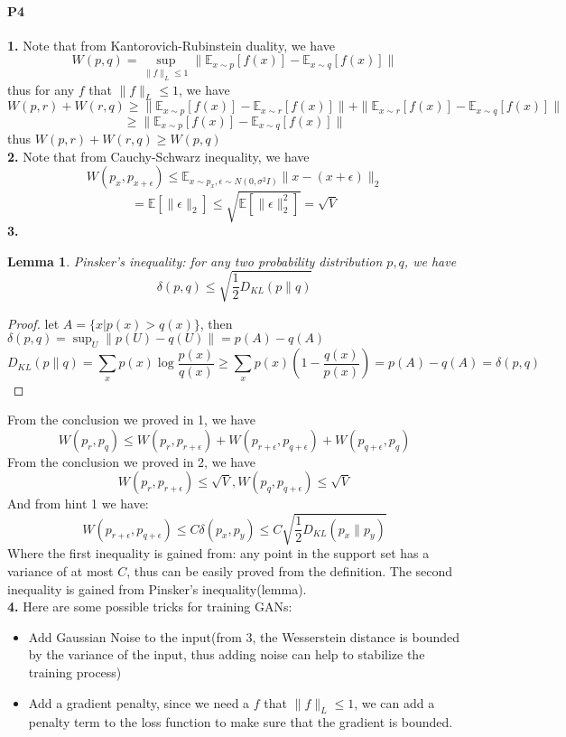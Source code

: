 \documentclass[a4 paper,12pt]{article}
\theoremstyle{definitionstyle}
\newtheorem{lem}{Lemma}
\newenvironment{framedminipage}
    {\begin{framed}\begin{minipage}{0.9\textwidth}}
    {\end{minipage}\end{framed}}
\begin{document}
\paragraph{P4}\textbf{1.} Note that from Kantorovich-Rubinstein duality, we have
\[
  W(p,q)=\sup_{\|f\|_L\le 1}\|\mathbb{E}_{x\sim p}[f(x)]-\mathbb{E}_{x\sim q}[f(x)]\|
\]
thus for any $f$ that $\|f\|_L\le 1$, we have
\[
  W(p,r)+W(r,q)\ge \|\mathbb{E}_{x\sim p}[f(x)]-\mathbb{E}_{x\sim r}[f(x)]\|+\|\mathbb{E}_{x\sim r}[f(x)]-\mathbb{E}_{x\sim q}[f(x)]\|
\]
\[
  \ge \|\mathbb{E}_{x\sim p}[f(x)]-\mathbb{E}_{x\sim q}[f(x)]\|
\]
thus $W(p,r)+W(r,q)\ge W(p,q)$\\
\textbf{2.} Note that from Cauchy-Schwarz inequality, we have
\[
  W(p_x,p_{x+\epsilon})\le\mathbb{E}_{x\sim p_x,\epsilon\sim N(0,\sigma^2 I)}\|x-(x+\epsilon)\|_2
\]
\[
  =\mathbb{E}[\|\epsilon\|_2]\le\sqrt{\mathbb{E}[\|\epsilon\|_2^2]}=\sqrt{V}
\]
\textbf{3.}
\begin{framedminipage}
\begin{lem}
Pinsker's inequality: for any two probability distribution $p,q$, we have
\[
  \delta(p,q)\le\sqrt{\frac 1 2 D_{KL}(p\|q)}
\]
\end{lem}
\end{framedminipage}
\begin{proof}
let $A=\{x|p(x)>q(x)\}$, then $\delta(p,q)=\sup_U\|p(U)-q(U)\|=p(A)-q(A)$
\[
  D_{KL}(p\|q)=\sum_x p(x)\log\frac{p(x)}{q(x)}\ge\sum_x p(x)(1-\frac{q(x)}{p(x)})=p(A)-q(A)=\delta(p,q)
\]
\end{proof}
From the conclusion we proved in 1, we have
\[
  W(p_r,p_q)\le W(p_r,p_{r+\epsilon})+W(p_{r+\epsilon},p_{q+\epsilon})+W(p_{q+\epsilon},p_q)
\]
From the conclusion we proved in 2, we have
\[
  W(p_r,p_{r+\epsilon})\le\sqrt{V},W(p_{q},p_{q+\epsilon})\le\sqrt{V}
\]
And from hint 1 we have:
\[
  W(p_{r+\epsilon},p_{q+\epsilon})\le C\delta(p_x,p_y)\le C\sqrt{\frac 1 2 D_{KL}(p_x\|p_y)}
\]
Where the first inequality is gained from: any point in the support set has a variance of at most $C$, thus can be easily proved from the definition. The second inequality is gained from Pinsker's inequality(lemma).\\
\textbf{4.}
Here are some possible tricks for training GANs:
\begin{itemize}
  \item Add Gaussian Noise to the input(from 3, the Wesserstein distance is bounded by the variance of the input, thus adding noise can help to stabilize the training process)
  \item Add a gradient penalty, since we need a $f$ that $\|f\|_L\le 1$, we can add a penalty term to the loss function to make sure that the gradient is bounded.
\end{itemize}
\end{document}
